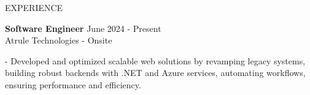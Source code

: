 \documentclass{resume} %
\begin{document}


\begin{rSection}{EXPERIENCE}
	
	\textbf{Software Engineer} \hfill June 2024 - Present\\
	Atrule Technologies - Onsite %
		\itemsep 1pt {} 
				
		\item - Developed and optimized scalable web solutions by revamping legacy systems, building robust backends with .NET and Azure services, automating workflows, ensuring performance and efficiency.
		
		

\end{rSection}
\end{document}
